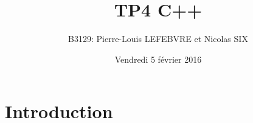 \documentclass[a4paper, 12pts]{article}
\title{TP4 C++}
\author{B3129: Pierre-Louis LEFEBVRE et Nicolas SIX}
\date{Vendredi 5 février 2016}
\begin{document}
\begin{titlepage}

\maketitle

\end{titlepage}


\tableofcontents

\pagebreak



\part{Introduction}
\paragraph{}


\end{document}
